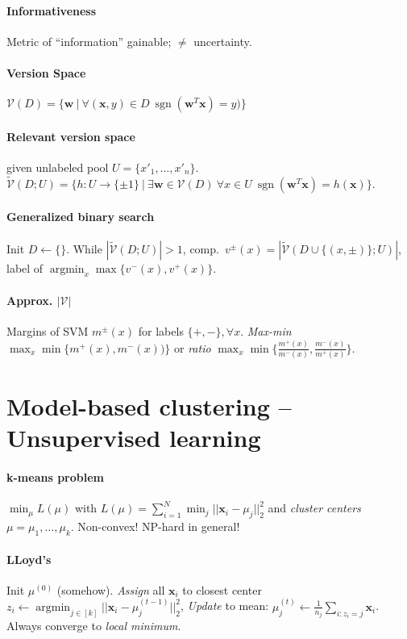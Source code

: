 \documentclass[9pt]{scrartcl}
\DeclareMathOperator{\sign}{sgn}
\DeclareMathOperator{\argmin}{argmin}
\begin{document}
\begin{twocolumn}
\paragraph{Informativeness}
Metric of “information” gainable; $\neq$ uncertainty.
\paragraph{Version Space}
$\mathcal{V}(D) = \{\bm w\ |\ \forall(\bm x,y)\in D\ \sign(\bm w^T\bm x) = y)\}$

\paragraph{Relevant version space} given unlabeled pool $U = \{x'_1,\dots,x'_n\}$.
$\tilde{\mathcal{V}}(D;U) = \{h: U\rightarrow\{\pm 1\}\ |\ \exists\bm w \in \mathcal{V}(D)\ \forall x\in U\ \sign(\bm w^T \bm x) = h(\bm x)\}.$

\paragraph{Generalized binary search}
Init $D \leftarrow \{\}$.
While $|\tilde{\mathcal{V}}(D;U)| > 1$, comp.\ $v^\pm(x) = |\tilde{\mathcal{V}}(D \cup \{(x,\pm)\};U)|$, label of $\argmin_x \max\{v^-(x),v^+(x)\}$.

\paragraph{Approx. $|\mathcal{V}|$}
Margins of SVM $m^\pm(x)$ for labels $\{+,-\}, \forall x$. \emph{Max-min} $\max_x \min\{m^+(x),m^-(x))\}$ or \emph{ratio} $\max_x \min\{\frac{m^+(x)}{m^-(x)},\frac{m^-(x)}{m^+(x)}\}$.

\section{Model-based clustering -- Unsupervised learning}
\paragraph{k-means problem}
$\min_\mu L(\mu)$ with
$L(\mu) = \sum_{i=1}^{N}\min_j||\bm x_i-\mu_j||_2^2$ and \emph{cluster centers} $\mu = \mu_1,\dots,\mu_k$.
Non-convex! NP-hard in general!

\paragraph{LLoyd's}
Init $\mu^{(0)}$ (somehow).
\emph{Assign} all $\bm x_i$ to closest center $z_i \leftarrow \argmin_{j \in [k]} ||\bm x_i - \mu_j^{(t-1)}||_2^2$,
\emph{Update} to mean: $\mu_j^{(t)} \leftarrow \frac{1}{n_j}\sum_{i:z_i = j}\bm x_i$.
Always converge to \emph{local minimum}.


\end{twocolumn}
\end{document}
